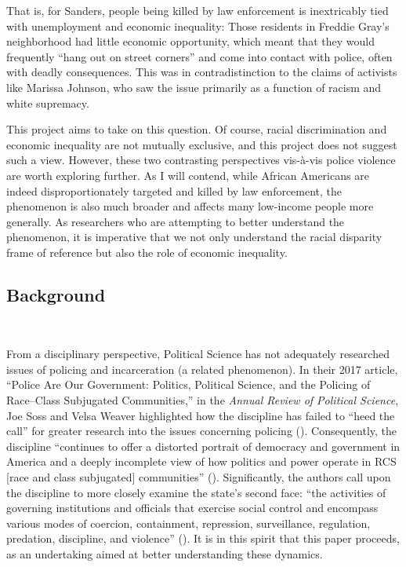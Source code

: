 \documentclass[12pt]{article}
\begin{document}
That is, for Sanders, people being killed by law enforcement is inextricably tied with
unemployment and economic inequality: Those residents in Freddie Gray’s neighborhood had
little economic opportunity, which meant that they would frequently “hang out on street corners”
and come into contact with police, often with deadly consequences. This was in contradistinction
to the claims of activists like Marissa Johnson, who saw the issue primarily as a function of
racism and white supremacy.

This project aims to take on this question. Of course, racial discrimination and economic inequality are not mutually exclusive, and this project does not suggest such a view. However, these two contrasting perspectives vis-à-vis police violence are worth exploring further. As I will contend, while African Americans are indeed disproportionately targeted and killed by law enforcement, the phenomenon is also much broader and affects many low-income people more generally. As researchers who are attempting to better understand the phenomenon, it is imperative that we not only understand the racial disparity frame of reference but also the role of economic inequality.

\subsection{Background}\

From a disciplinary perspective, Political Science has not adequately researched issues of policing and incarceration (a related phenomenon). In their 2017 article, “Police Are Our Government: Politics, Political Science, and the Policing of Race–Class Subjugated Communities,” in the \textit{Annual Review of Political Science}, Joe Soss and Velsa Weaver highlighted how the discipline has failed to “heed the call” for greater research into the issues concerning policing (\citeyear[568]{sossPoliceAreOur2017}). Consequently, the discipline “continues to offer a distorted portrait of democracy and government in America and a deeply incomplete view of how politics and power operate in RCS [race and class subjugated] communities” (\cite[568]{sossPoliceAreOur2017}). Significantly, the authors call upon the discipline to more closely examine the state’s second face: “the activities of governing institutions and officials that exercise social control and encompass various modes of coercion, containment, repression, surveillance, regulation, predation, discipline, and violence” (\cite[567]{sossPoliceAreOur2017}). It is in this spirit that this paper proceeds, as an undertaking aimed at better understanding these dynamics.
\end{document}

